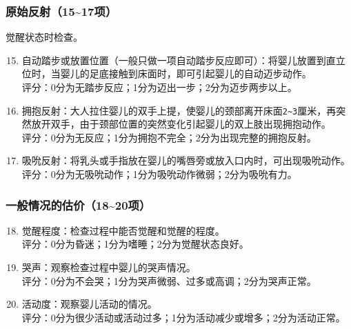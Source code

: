 \subsubsection{原始反射（15\textasciitilde17项）}

觉醒状态时检查。

\begin{enumerate}
\setcounter{enumi}{14}
\item
  自动踏步或放置位置（一般只做一项自动踏步反应即可）：将婴儿放置到直立位时，当婴儿的足底接触到床面时，即可引起婴儿的自动迈步动作。\\
  评分：0分为无踏步反应；1分为迈出一步；2分为迈步两步以上。
\item
  拥抱反射：大人拉住婴儿的双手上提，使婴儿的颈部离开床面\texttt{2\textasciitilde{}3}\hspace{0pt}厘米，再突然放开双手，由于颈部位置的突然变化引起婴儿的双上肢出现拥抱动作。\\
  评分：0分为无反应；1分为拥抱不完全；2分为出现完整的拥抱反射。
\item
  吸吮反射：将乳头或手指放在婴儿的嘴唇旁或放入口内时，可出现吸吮动作。\\
  评分：0分为无吸吮动作；1分为吸吮动作微弱；2分为吸吮有力。
\end{enumerate}


\subsubsection{一般情况的估价（18\textasciitilde20项）}%

\begin{enumerate}
\setcounter{enumi}{17}
\item
  觉醒程度：检查过程中能否觉醒和觉醒的程度。\\
  评分：0分为昏迷；1分为嗜睡；2分为觉醒状态良好。
\item
  哭声：观察检查过程中婴儿的哭声情况。\\
  评分：0分为不会哭；1分为哭声微弱、过多或高调；2分为哭声正常。
\item
  活动度：观察婴儿活动的情况。\\
  评分：0分为很少活动或活动过多；1分为活动减少或增多；2分为活动正常。
\end{enumerate}

